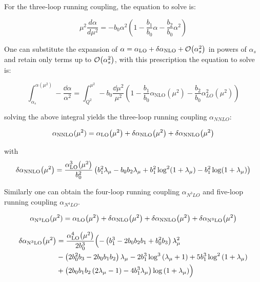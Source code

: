 \documentclass[../main.tex]{subfiles}
\begin{document}
For the three-loop running coupling, the equation to solve is:

\begin{equation}
    \mu^2 \frac{d\alpha}{d\mu^2} = - b_0 \alpha^2(1 - \frac{b_1}{b_0} \alpha - \frac{b_2}{b_0} \alpha^2)
\end{equation}

One can substitute the expansion of $\alpha= \alpha_{\text{LO}}+\delta\alpha_{\text{NLO}}+\order{\alpha_s^2}$ in powers of $\alpha_s$ 
and retain only terms up to $\order{\alpha_s^2}$, with this prescription the equation to solve is:

\begin{equation}
    \int_{\alpha_s}^{\alpha(\mu^2)} -\frac{\dd\alpha}{\alpha^2} = 
    \int _{Q^2}^{\mu^2} - b_0 \frac{ \dd\mu^2}{\mu^2} ( 1 - \frac{b_1}{b_0} \alpha_{\text{NLO}}(\mu^2) - \frac{b_2}{b_0} \alpha_{LO}^2(\mu^2) )
\end{equation}

solving the above integral yields the three-loop running coupling $\alpha_{NNLO}$:

\begin{equation}\label{eq:NNLO}
    \alpha_{\text{NNLO}}(\mu^2) = \alpha_{\text{LO}}\qty(\mu^2) + \delta\alpha_{\text{NLO}}\qty(\mu^2)+\delta\alpha_{\text{NNLO}}\qty(\mu^2)
\end{equation}

with 
\begin{equation}\label{eq:DNNLO}
    \delta\alpha_{\text{NNLO}}\qty(\mu^2) = \frac{\alpha_{\text{LO}}^3\qty(\mu^2)}{b_0^2}\left(b _1^2 \lambda_\mu -b_0 b_2 \lambda_\mu +b_1^2 \log ^2(1+\lambda_\mu )-b_1^2 \log (1+\lambda_\mu )\right)    
\end{equation}

Similarly one can obtain the four-loop running coupling $\alpha_{N^3LO}$ and five-loop running coupling $\alpha_{N^4LO}$.

\begin{equation}\label{eq:N3LO}
    \alpha_{\text{N}^3\text{LO}}(\mu^2) = \alpha_{\text{LO}}\qty(\mu^2) + \delta\alpha_{\text{NLO}}\qty(\mu^2)+\delta\alpha_{\text{NNLO}}\qty(\mu^2)+\delta\alpha_{\text{N}^3\text{LO}}\qty(\mu^2)
\end{equation}

\begin{equation}\label{eq:DN3LO}
    \begin{split}
        \delta\alpha_{\text{N}^3\text{LO}}\qty(\mu^2) &= \frac{\alpha_{\text{LO}}^4\qty(\mu^2)}{2 b_0^3} \Bigl(-\left(b_1^3-2 b_0 b_2 b_1+b_0^2 b_3\right) \lambda _{\mu }^2\\
        &-\left(2 b_0^2 b_3-2 b_0 b_1 b_2\right) \lambda _{\mu }-2 b_1^3 \log ^3\left(\lambda _{\mu }+1\right)+5 b_1^3 \log ^2\left(1+\lambda _{\mu }\right)\\
        &+\left(2 b_0 b_1 b_2 \left(2 \lambda _{\mu }-1\right)-4 b_1^3 \lambda _{\mu }\right) \log \left(1+\lambda _{\mu }\right)\Bigr)
    \end{split}
\end{equation}
\end{document}
